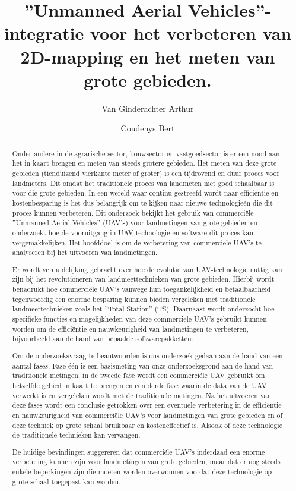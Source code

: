 \documentclass{hogent-article}
\title{''Unmanned Aerial Vehicles''-integratie voor het verbeteren van 2D-mapping en het meten van grote gebieden.}
\author{Van Ginderachter Arthur}
\author{Coudenys Bert}
\begin{document}
\begin{abstract}

Onder andere in de agrarische sector, bouwsector en vastgoedsector is er een nood aan het in kaart brengen en meten van steeds grotere gebieden.
Het meten van deze grote gebieden (tienduizend vierkante meter of groter) is een tijdrovend en duur proces voor landmeters. Dit omdat het traditionele proces van landmeten niet goed schaalbaar is voor die grote gebieden. In een wereld waar continu gestreefd wordt naar efficiëntie en kostenbesparing is het dus belangrijk om te kijken naar nieuwe technologieën die dit proces kunnen verbeteren.
Dit onderzoek bekijkt het gebruik van commerciële ''Unmanned Aerial Vehicles'' (UAV's) voor landmetingen van grote gebieden en onderzoekt hoe de vooruitgang in UAV-technologie en software dit proces kan vergemakkelijken.
Het hoofddoel is om de verbetering van commerciële UAV's te analyseren bij het uitvoeren van landmetingen.

\vspace{0.5cm}

Er wordt verduidelijking gebracht over hoe de evolutie van UAV-technologie nuttig kan zijn bij het revolutioneren van landmeettechnieken van grote gebieden.
Hierbij wordt benadrukt hoe commerciële UAV's vanwege hun toegankelijkheid en betaalbaarheid tegenwoordig een enorme besparing kunnen bieden vergeleken met traditionele landmeettechnieken zoals het ''Total Station'' (TS).
Daarnaast wordt onderzocht hoe specifieke functies en mogelijkheden van deze commerciële UAV's gebruikt kunnen worden om de efficiëntie en nauwkeurigheid van landmetingen te verbeteren, bijvoorbeeld aan de hand van bepaalde softwarepakketten.

\vspace{0.5cm}
Om de onderzoeksvraag te beantwoorden is ons onderzoek gedaan aan de hand van een aantal fases. Fase één is een basismeting van onze onderzoeksgrond aan de hand van traditionele metingen, in de tweede fase wordt een commerciële UAV gebruikt om hetzelfde gebied in kaart te brengen en een derde fase waarin de data van de UAV verwerkt is en vergeleken wordt met de traditionele metingen.
Na het uitvoeren van deze fases wordt een conclusie getrokken over een eventuele verbetering in de efficiëntie en nauwkeurigheid van commerciële UAV's voor landmetingen van grote gebieden en of deze techniek op grote schaal bruikbaar en kosteneffectief is. Alsook of deze technologie de traditionele technieken kan vervangen.

\vspace{0.5cm}

De huidige bevindingen suggereren dat commerciële UAV's inderdaad een enorme verbetering kunnen zijn voor landmetingen van grote gebieden, maar dat er nog steeds enkele beperkingen zijn die moeten worden overwonnen voordat deze technologie op grote schaal toegepast kan worden.

\end{abstract}
\end{document}
